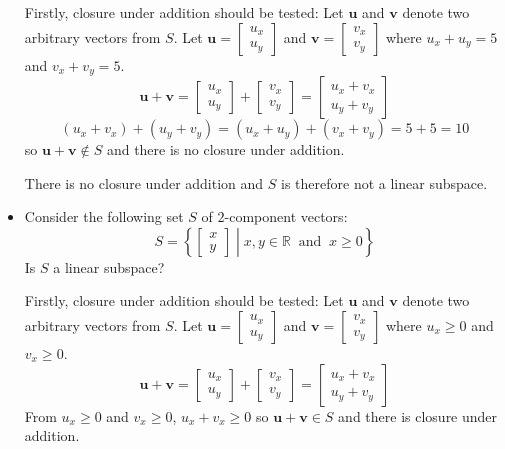 \documentclass{article}
\begin{document}
\begin{itemize}
Firstly, closure under addition should be tested:
Let \(\mathbf{u}\) and \(\mathbf{v}\) denote two arbitrary vectors from \(S\). Let \(\mathbf{u} = \begin{bmatrix} u_x \\ u_y \end{bmatrix}\) and \(\mathbf{v} = \begin{bmatrix} v_x \\ v_y \end{bmatrix}\) where \(u_x + u_y = 5\) and \(v_x + v_y = 5\).
\[\mathbf{u} + \mathbf{v} = \begin{bmatrix} u_x \\ u_y \end{bmatrix} + \begin{bmatrix} v_x \\ v_y \end{bmatrix} = \begin{bmatrix} u_x + v_x \\ u_y + v_y \end{bmatrix}\]
\[(u_x + v_x) + (u_y + v_y) = (u_x + u_y) + (v_x + v_y) = 5 + 5 = 10\]
so \(\mathbf{u} + \mathbf{v} \notin S\) and there is no closure under addition. 

There is no closure under addition and \(S\) is therefore not a linear subspace.
\item Consider the following set \(S\) of \(2\)-component vectors:
\[S = \left\{\begin{bmatrix} x \\ y \end{bmatrix}\middle| x, y \in \mathbb{R} \;\;\text{and}\;\; x \geq 0 \right\}\]
Is \(S\) a linear subspace? 

Firstly, closure under addition should be tested:
Let \(\mathbf{u}\) and \(\mathbf{v}\) denote two arbitrary vectors from \(S\). Let \(\mathbf{u} = \begin{bmatrix} u_x \\ u_y \end{bmatrix}\) and \(\mathbf{v} = \begin{bmatrix} v_x \\ v_y \end{bmatrix}\) where \(u_x \geq 0\) and \(v_x \geq 0\).
\[\mathbf{u} + \mathbf{v} = \begin{bmatrix} u_x \\ u_y \end{bmatrix} + \begin{bmatrix} v_x \\ v_y \end{bmatrix} = \begin{bmatrix} u_x + v_x \\ u_y + v_y \end{bmatrix}\]
From \(u_x \geq 0\) and \(v_x \geq 0\), \(u_x + v_x \geq 0\) so \(\mathbf{u} + \mathbf{v} \in S\) and there is closure under addition. 


\end{itemize}
\end{document}
